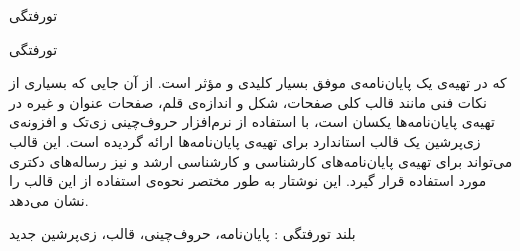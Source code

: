 

‌تورفتگی


‌تورفتگی

که در تهیه‌ی یک پایان‌نامه‌ی موفق بسیار کلیدی و مؤثر است.
از آن جایی که بسیاری از نکات فنی مانند قالب کلی صفحات، شکل و اندازه‌ی قلم، 
صفحات عنوان و غیره در تهیه‌ی پایان‌نامه‌ها یکسان است،
با استفاده از نرم‌افزار حروف‌چینی زی‌تک %
و افزونه‌ی زی‌پرشین %
یک قالب استاندارد برای تهیه‌ی پایان‌نامه‌ها ارائه گردیده است.
این قالب می‌تواند برای تهیه‌ی پایان‌نامه‌های
کارشناسی و کارشناسی ارشد و نیز رساله‌ها‌ی دکتری مورد استفاده قرار گیرد.
این نوشتار به طور مختصر نحوه‌ی استفاده از این قالب را نشان می‌دهد.

‌بلند
‌تورفتگی : 
پایان‌نامه، حروف‌چینی، قالب، زی‌پرشین
‌جدید
